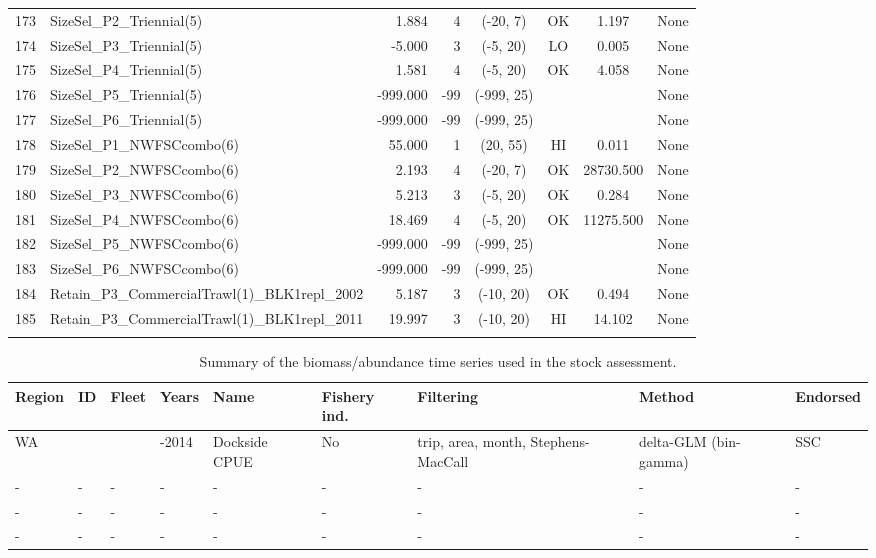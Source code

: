 \documentclass[12pt,]{article}
\begin{document}
\begin{landscape}
\begin{longtable}{rlrrcccl}
  173 & SizeSel\_P2\_Triennial(5) & 1.884 & 4 & (-20, 7) & OK & 1.197 & None \\ 
  174 & SizeSel\_P3\_Triennial(5) & -5.000 & 3 & (-5, 20) & LO & 0.005 & None \\ 
  175 & SizeSel\_P4\_Triennial(5) & 1.581 & 4 & (-5, 20) & OK & 4.058 & None \\ 
  176 & SizeSel\_P5\_Triennial(5) & -999.000 & -99 & (-999, 25) &  &  & None \\ 
  177 & SizeSel\_P6\_Triennial(5) & -999.000 & -99 & (-999, 25) &  &  & None \\ 
  178 & SizeSel\_P1\_NWFSCcombo(6) & 55.000 & 1 & (20, 55) & HI & 0.011 & None \\ 
  179 & SizeSel\_P2\_NWFSCcombo(6) & 2.193 & 4 & (-20, 7) & OK & 28730.500 & None \\ 
  180 & SizeSel\_P3\_NWFSCcombo(6) & 5.213 & 3 & (-5, 20) & OK & 0.284 & None \\ 
  181 & SizeSel\_P4\_NWFSCcombo(6) & 18.469 & 4 & (-5, 20) & OK & 11275.500 & None \\ 
  182 & SizeSel\_P5\_NWFSCcombo(6) & -999.000 & -99 & (-999, 25) &  &  & None \\ 
  183 & SizeSel\_P6\_NWFSCcombo(6) & -999.000 & -99 & (-999, 25) &  &  & None \\ 
  184 & Retain\_P3\_CommercialTrawl(1)\_BLK1repl\_2002 & 5.187 & 3 & (-10, 20) & OK & 0.494 & None \\ 
  185 & Retain\_P3\_CommercialTrawl(1)\_BLK1repl\_2011 & 19.997 & 3 & (-10, 20) & HI & 14.102 & None \\ 
   \hline
\hline
\label{tab:model_params}
\end{longtable}
\end{landscape}

\newpage

\begin{table}[ht]
\centering
\caption{Summary of the biomass/abundance
                                              time series used in the stock
                                              assessment.} 
\label{tab:Index_summary}
\begin{tabular}{>{\centering}p{.4in}>{\centering}p{.3in}>{\centering}p{.3in}>{\centering}p{.3in}>{\centering}p{.6in}>{\centering}p{.5in}>{\centering}p{.8in}>{\centering}p{.8in}>{\centering}p{.5in}}
  \hline
Region & ID & Fleet & Years & Name & Fishery ind. & Filtering & Method & Endorsed \\ 
  \hline
WA & 1 & 4 & 1981-2014 & Dockside CPUE & No & trip, area, month, Stephens-MacCall & delta-GLM (bin-gamma) & SSC \\ 
  - & - & - & - & - & - & - & - & - \\ 
  - & - & - & - & - & - & - & - & - \\ 
  - & - & - & - & - & - & - & - & - \\ 
   \hline
\end{tabular}
\end{table}
\end{document}
